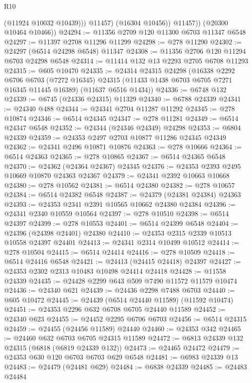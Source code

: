 \begin{lexlean}{R10}
\begin{coremodule}
                  (@11924 @10032 @10439)))
              @11457)
            (@16304 @10456))
          @11457))
      (@20300 @10464 @10466))
@24294 := @11356 @2709 @120 @11300 @6703 @11347 @6548
@24297 := @11397 @2708 @11296 @11299
@24298 := @278 @11290
@24302 := @24297 (@6514 @24298 @6548) @11347
@24308 := @11356 @2706 @120 @11294 @6703 @24298 @6548
@24314 := @11414 @132 @13 @2293 @2705 @6708 @11293
@24315 := @605 @10470
@24335 := @24314
    @24315
    @24298
    (@16338
      @2292
      @6706
      @6703
      (@7272 @16345)
      @24315
      (@11433 @1438 @6703 @6705 @7271 @16345 @11445 @16389)
      (@11637 @6516 @1434))
@24336 := @6748 @132
@24339 := @6745 (@24336 @24315) @11329
@24340 := @6788 @24339
@24341 := @24340 @488
@24344 := @24341 @2704 @11287 @11292
@24345 := @278 @10874
@24346 := @6514 @24345
@24347 := @278 @11281
@24349 := @6514 @24347 @6548
@24352 := @24344 (@24346 @24349) @24298
@24353 := @6804 @24339
@24359 := @24353 @2497 @2703 @10877 @11286 @24345 @24349
@24362 := @24341 @2496 @10871 @10876
@24363 := @278 @10666
@24364 := @6514 @24363
@24365 := @278 @10865
@24367 := @6514 @24365 @6548
@24370 := @24362 (@24364 @24367) @24345
@24376 := @24353 @2393 @2495 @10669 @10870 @24363 @24367
@24379 := @24341 @2392 @10663 @10668
@24380 := @278 @10562
@24381 := @6514 @24380
@24382 := @278 @10657
@24384 := @6514 @24382 @6548
@24387 := @24379 (@24381 @24384) @24363
@24393 := @24353 @2341 @2391 @10565 @10662 @24380 @24384
@24396 := @24341 @2340 @10559 @10564
@24397 := @278 @10510
@24398 := @6514 @24397
@24399 := @278 @10553
@24401 := @6514 @24399 @6548
@24404 := @24396 (@24398 @24401) @24380
@24410 := @24353 @2315 @2339 @10513 @10558 @24397 @24401
@24413 := @24341 @2314 @10499 @10512
@24414 := @278 @10504
@24415 := @6514 @24414
@24416 := @278 @10509
@24418 := @6514 @24416 @6548
@24421 := @24413 (@24415 @24418) @24397
@24427 := @24353 @2302 @2313 @10483 @10498 @24414 @24418
@24428 := @11558 @24339
@24435 := @24428 @2299 @643 @509 @7490 @11572 @11579 @10474
@24436 := @24340 @621
@24439 := @24436 @2298 @7488 @6703
@24440 := @605 @10472
@24445 := @24439 (@6514 @24440 @11589) (@11592 @10474)
@24451 := @24353 @2296 @632 @6708 @6705 @24440 @11589
@24452 := @24340 @623
@24455 := @24452 @2295 @6706 @6703
@24456 := @6514 @24315
@24459 := @24455 (@24456 @11589) @24440
@24460 := @24353 @342
@24465 := @24460 @632 @6703 @6705 @24315 @11589
@24472 := @6813 @24339 @132 @24315 (@6818 (@6819 @24339 @132))
@24473 := @24465 @24472
@24479 := @24353 @630 @120 @6703 @6703 @629 @6548
@24481 := @6983 @24339 @13
@24483 := @24479 (@24481 @629)
@24484 := @6838 @24339
@24485 := @24483 @24484

\end{coremodule}
\end{lexlean}
